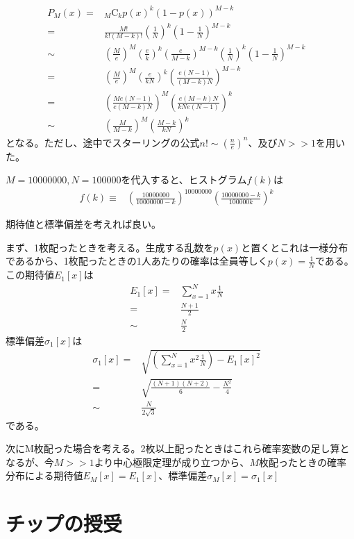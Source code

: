 \documentclass[ %
  platex,%
  papersize,%
  twocolumn,
  landscape
]{jsarticle}
\begin{document}
\begin{align}
  P_M(x)=&{}_M \mathrm{C}_k p(x)^k (1-p(x))^{M-k}&\\
  =&\frac{M!}{k!(M-k)!}\left(\frac{1}{N}\right)^k \left(1-\frac{1}{N}\right)^{M-k}&\\
  \sim&\left(\frac{M}{e}\right)^{M}\left(\frac{e}{k}\right)^{k}\left(\frac{e}{M-k}\right)^{M-k}\left(\frac{1}{N}\right)^k \left(1-\frac{1}{N}\right)^{M-k}&\\
  =&\left(\frac{M}{e}\right)^{M}\left(\frac{e}{kN}\right)^{k}\left(\frac{e(N-1)}{(M-k)N}\right)^{M-k}&\\
  =&\left(\frac{Me(N-1)}{e(M-k)N}\right)^{M}\left(\frac{e(M-k)N}{kNe(N-1)}\right)^{k}&\\
  \sim&\left(\frac{M}{M-k}\right)^{M}\left(\frac{M-k}{kN}\right)^{k}&
\end{align}
となる。ただし、途中でスターリングの公式$n!\sim(\frac{n}{e})^n$、及び$N>>1$を用いた。

$M=10000000, N=100000$を代入すると、ヒストグラム$f(k)$は
\begin{align}
  f(k)\equiv&\left(\frac{10000000}{10000000-k}\right)^{10000000}\left(\frac{10000000-k}{100000k}\right)^{k}&
\end{align}

期待値と標準偏差を考えれば良い。

まず、1枚配ったときを考える。生成する乱数を$p(x)$と置くとこれは一様分布であるから、1枚配ったときの1人あたりの確率は全員等しく$p(x)=\frac{1}{N}$である。この期待値$E_1[x]$は
\begin{align}
  E_1[x]=&\sum_{x=1}^{N} x\frac{1}{N}&\\
  =&\frac{N+1}{2}&\\
  \sim&\frac{N}{2}&
\end{align}
標準偏差$\sigma_1[x]$は
\begin{align}
  \sigma_1[x]=&\sqrt{\left(\sum_{x=1}^{N} x^2\frac{1}{N}\right)-E_1[x]^2}&\\
  =&\sqrt{\frac{(N+1)(N+2)}{6}-\frac{N^2}{4}}&\\
  \sim&\frac{N}{2\sqrt{3}}&
\end{align}
である。

次にM枚配った場合を考える。2枚以上配ったときはこれら確率変数の足し算となるが、今$M>>1$より中心極限定理が成り立つから、$M$枚配ったときの確率分布による期待値$E_M[x]=E_1[x]$、標準偏差$\sigma_M[x]=\sigma_1[x]$

\section{チップの授受}\label{s-exchange}
\end{document}
